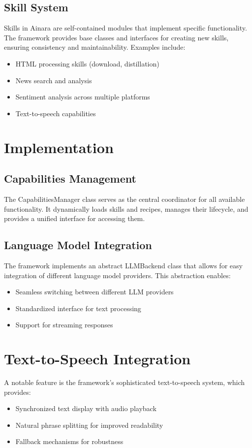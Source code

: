 \documentclass[conference]{IEEEtran}
\begin{document}
\subsection{Skill System}
Skills in Ainara are self-contained modules that implement specific functionality. The framework provides base classes and interfaces for creating new skills, ensuring consistency and maintainability. Examples include:
\begin{itemize}
    \item HTML processing skills (download, distillation)
    \item News search and analysis
    \item Sentiment analysis across multiple platforms
    \item Text-to-speech capabilities
\end{itemize}

\section{Implementation}
\subsection{Capabilities Management}
The CapabilitiesManager class serves as the central coordinator for all available functionality. It dynamically loads skills and recipes, manages their lifecycle, and provides a unified interface for accessing them.

\subsection{Language Model Integration}
The framework implements an abstract LLMBackend class that allows for easy integration of different language model providers. This abstraction enables:
\begin{itemize}
    \item Seamless switching between different LLM providers
    \item Standardized interface for text processing
    \item Support for streaming responses
\end{itemize}

\section{Text-to-Speech Integration}
A notable feature is the framework's sophisticated text-to-speech system, which provides:
\begin{itemize}
    \item Synchronized text display with audio playback
    \item Natural phrase splitting for improved readability
    \item Fallback mechanisms for robustness
\end{itemize}
\end{document}
